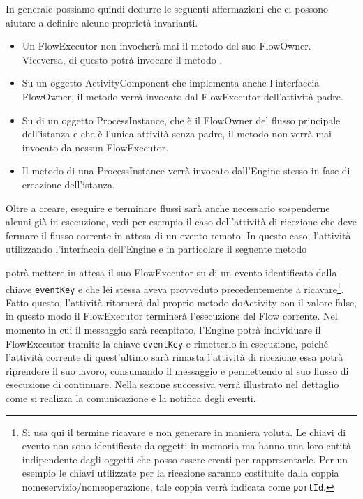 

In generale possiamo quindi dedurre le seguenti affermazioni che ci possono
aiutare a definire alcune proprietà invarianti.

\begin{itemize}
  \item Un FlowExecutor non invocherà mai il metodo  del suo
  FlowOwner. Viceversa, di questo potrà invocare il metodo
  .
  
  \item Su un oggetto ActivityComponent che implementa anche l'interfaccia
  FlowOwner, il metodo  verrà invocato dal FlowExecutor
  dell'attività padre.
  
  \item Su di un oggetto ProcessInstance, che \`e il FlowOwner del flusso
  principale dell'istanza e che \`e l'unica attività senza padre, 
  il metodo  non verrà mai invocato da nessun FlowExecutor.
  
  \item Il metodo  di una ProcessInstance verrà invocato
  dall'Engine stesso in fase di creazione dell'istanza.
  
\end{itemize}

Oltre a creare, eseguire e terminare flussi sarà anche necessario sospenderne
alcuni già in esecuzione, vedi per esempio il caso dell'attività di ricezione
che deve fermare il flusso corrente in attesa di un evento remoto. In questo
caso, l'attività utilizzando l'interfaccia dell'Engine e in particolare il
seguente metodo



potrà mettere in attesa il suo FlowExecutor su di un evento identificato dalla
chiave \texttt{eventKey} e che lei stessa aveva provveduto
precedentemente a ricavare\footnote{Si usa qui il termine ricavare e non generare in maniera
  voluta. Le chiavi di evento non sono identificate da oggetti in memoria ma
  hanno una loro entità indipendente
  dagli oggetti che posso essere creati per rappresentarle. Per un esempio le
  chiavi utilizzate per la ricezione saranno costituite dalla coppia
  nomeservizio/nomeoperazione, tale coppia verrà indicata come
  \texttt{portId}.}. Fatto questo, l'attività ritornerà dal proprio
metodo doActivity con il valore false, in questo modo il FlowExecutor terminerà
l'esecuzione del Flow corrente. Nel momento in cui il messaggio sarà recapitato,
l'Engine potrà individuare il FlowExecutor tramite la chiave \texttt{eventKey} e
rimetterlo in esecuzione, poiché l'attività corrente di quest'ultimo sarà rimasta
l'attività di ricezione essa potrà riprendere il suo lavoro, consumando il
messaggio e permettendo al suo flusso di esecuzione di continuare. Nella sezione
successiva verrà illustrato nel dettaglio come si realizza la comunicazione e la
notifica degli eventi.

